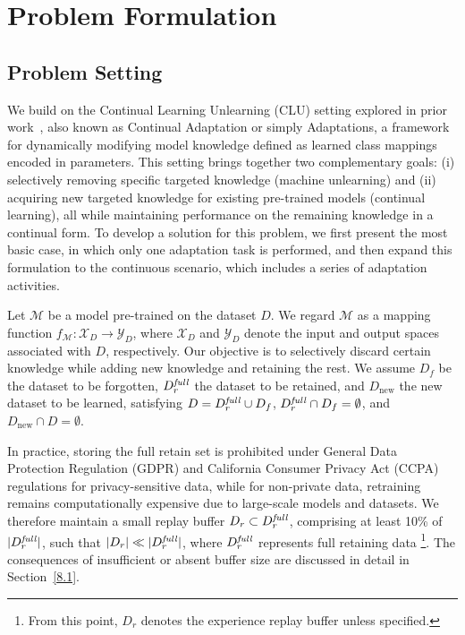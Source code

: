 \section{Problem Formulation}
\label{3}
\subsection{Problem Setting}
We build on the Continual Learning Unlearning (CLU) setting explored in prior work~\cite{shibata2021learning,chatterjee2024unified}, also known as Continual Adaptation or simply Adaptations, a framework for dynamically modifying model knowledge defined as learned class mappings encoded in parameters. This setting brings together two complementary goals: (i) selectively removing specific targeted knowledge (machine unlearning) and (ii) acquiring new targeted knowledge for existing pre-trained models (continual learning), all while maintaining performance on the remaining knowledge in a continual form. To develop a solution for this problem, we first present the most basic case, in which only one adaptation task is performed, and then expand this formulation to the continuous scenario, which includes a series of adaptation activities.

Let $\mathcal{M}$ be a model pre-trained on the dataset $D$. We regard $\mathcal{M}$ as a mapping function $f_\mathcal{M} : \mathcal{X}_D \rightarrow \mathcal{Y}_D$, where $\mathcal{X}_D$ and $\mathcal{Y}_D$ denote the input and output spaces associated with $D$, respectively. Our objective is to selectively discard certain knowledge while adding new knowledge and retaining the rest. We assume $D_f$ be the dataset to be forgotten, $D^\text{\textit{full}}_r$ the dataset to be retained, and $D_{\text{new}}$ the new dataset to be learned, satisfying $D = D^\text{\textit{full}}_r \cup D_f$, $D^\text{\textit{full}}_r \cap D_f = \emptyset$, and $D_{\text{new}} \cap D = \emptyset$.

In practice, storing the full retain set is prohibited under General Data Protection Regulation (GDPR) and California Consumer Privacy Act (CCPA) regulations for privacy-sensitive data, while for non-private data, retraining remains computationally expensive due to large-scale models and datasets. We therefore maintain a small replay buffer $D_r \subset D^\text{\textit{full}}_r$, comprising at least 10\% of $|D^\text{\textit{full}}_r|$, such that $|D_r| \ll |D^\text{\textit{full}}_r|$, where $D^\text{\textit{full}}_r$ represents full retaining data \footnote{From this point, $D_r$ denotes the experience replay buffer unless specified.}. The consequences of insufficient or absent buffer size are discussed in detail in Section~\ref{8.1}.



